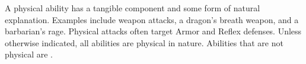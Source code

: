     \label{Physical Abilities} A physical ability has a tangible component and some form of natural explanation.
    Examples include weapon attacks, a dragon's breath weapon, and a barbarian's rage.
    Physical attacks often target Armor and Reflex defenses.
    Unless otherwise indicated, all abilities are physical in nature.
    Abilities that are not physical are .

